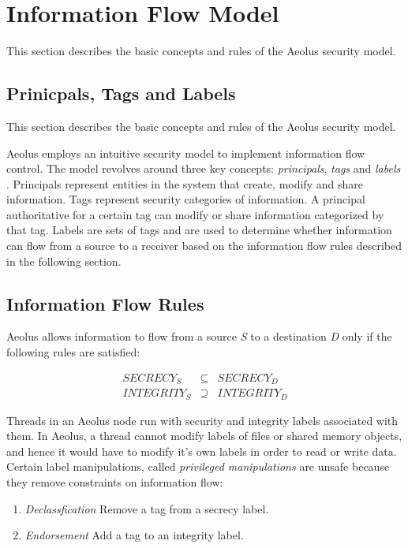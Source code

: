 \section{Information Flow Model}

This section describes the basic concepts and rules of the Aeolus security model.

\subsection{Prinicpals, Tags and Labels}\label{principals}

This section describes the basic concepts and rules of the Aeolus security model.

Aeolus employs an intuitive security model to implement information flow control. The model revolves around three key concepts: \emph{principals}, \emph{tags} and \emph{labels} \cite{aeolus}. Principals represent entities in the system that create, modify and share information. Tags represent security categories of information. A principal authoritative for a certain tag can modify or share information categorized by that tag. Labels are sets of tags and are used to determine whether information can flow from a source to a receiver based on the information flow rules described in the following section.

\subsection{Information Flow Rules}\label{difc:rules}

Aeolus allows information to flow from a source \emph{S} to a destination \emph{D} only if the following rules are satisfied:

\begin{eqnarray*}
  SECRECY_{S} &\subseteq& SECRECY_{D} \\
  INTEGRITY_{S} &\supseteq& INTEGRITY_{D}
\end{eqnarray*}

Threads in an Aeolus node run with security and integrity labels associated with them. In Aeolus, a thread cannot modify labels of files or shared memory objects, and hence it would have to modify it's own labels in order to read or write data. Certain label manipulations, called \emph{privileged manipulations} are unsafe because they remove constraints on information flow:

\begin{enumerate}
  \item \emph{Declassfication} Remove a tag from a secrecy label.
  \item \emph{Endorsement} Add a tag to an integrity label.
\end{enumerate}

